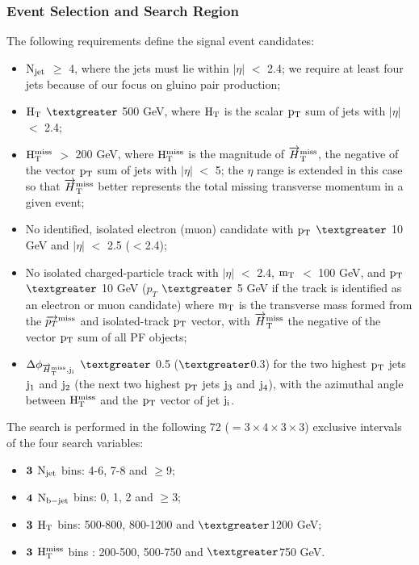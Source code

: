 \subsubsection{Event Selection and Search Region}  
The following requirements define the  signal event candidates:
\begin{itemize}
\item $\rm N_{jet}$ $\geq$ 4, where the jets must lie within $|\eta|$ $<$ 2.4; we require at least four jets because of
our focus on gluino pair production;
\item $\rm H_{T}$ $\textgreater $ 500 GeV, where $\rm H_{T}$ is the scalar $\rm p_{T}$ sum of jets with $|\eta|$ $<$ 2.4;

\item $\rm H_{T}^{miss}$ $>$ 200 GeV, where $\rm H_{T}^{miss}$ is the magnitude of $\rm \overrightarrow{H}_{T}^{miss}$, the negative of the vector
$\rm p_{T}$ sum of jets with $|\eta|$ $<$ 5; the $\eta$ range is extended in this case so that  ${\rm \overrightarrow{H}_{T}^{miss}}$ better
represents the total missing transverse momentum in a given event;

\item  No identified, isolated electron (muon) candidate with $\rm p_{T}$ $\textgreater$ 10 GeV and $|\eta|$ $<$ 2.5 ($<$2.4);

\item No isolated charged-particle track with $|\eta|$ $<$  2.4, $\rm m_{T}$ $<$ 100 GeV, and $\rm p_{T}$ $\textgreater $ 10 GeV
($p_{T}$ $\textgreater$ 5 GeV if the track is identified as an electron or muon candidate) where $\rm m_{T}$ is the transverse mass formed from the ${\rm \overrightarrow{p_{T}}^{miss}}$ and isolated-track
$\rm p_{T}$ vector, with ${\rm \overrightarrow{H}_{T}^{miss}}$ the negative of the vector  $\rm p_{T}$ sum of all PF objects;

\item  $\Delta \phi_{\rm \overrightarrow{H}_{T}^{miss},j_{i}}$  $\textgreater$ 0.5 ($\textgreater$0.3) for the two highest $\rm p_{T}$ jets $\rm j_{1}$ and $\rm j_{2}$ (the next two highest $\rm p_{T}$ jets
$\rm j_{3}$ and $\rm j_{4}$), with   the azimuthal angle between $\rm H_{T}^{miss}$ and the $\rm p_{T}$ vector of jet $\rm j_{i}$.

\end{itemize}
The search is performed in the following 72 ($=3\times4\times3\times3$) exclusive intervals of the four search variables:
\begin{itemize}

 \item ${\bf 3 }$ $\rm N_{jet}$ bins: 4-6, 7-8 and $\geq$9;
 \item ${\bf 4 }$ $\rm N_{b-jet}$ bins: 0, 1, 2 and $\geq$3;
 \item ${\bf 3 }$ $\rm H_{T}$ bins: 500-800, 800-1200 and $\textgreater$1200 GeV;
 \item ${\bf 3 }$ $\rm H_{T}^{miss}$ bins : 200-500, 500-750 and $\textgreater$750 GeV.
\end{itemize}

